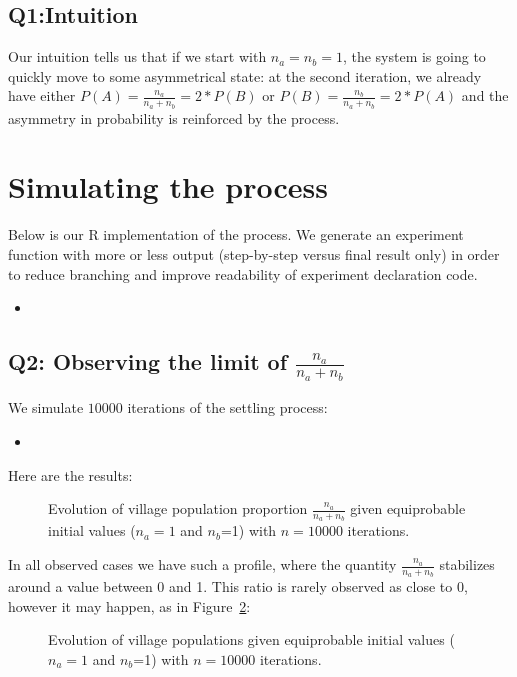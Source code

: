\documentclass{beamer}
\newcommand{\Rscript}[2]{
    \begin{itemize}
        \item[]
    \end{itemize}
}
\begin{document}
\subsection*{Q1:Intuition}
\label{sub:q1_intuition}

Our intuition tells us that if we start with $n_a=n_b=1$, the system is going to quickly move to some asymmetrical state: at the second iteration, we already have either $P(A)=\frac{n_a}{n_a+n_b}=2*P(B)$ or $P(B)=\frac{n_b}{n_a+n_b}=2*P(A)$ and the asymmetry in probability is reinforced by the process.


\section{Simulating the process}
\label{sec:simulating_the_process}

Below is our R implementation of the process. We generate an experiment function with more or less output (step-by-step versus final result only) in order to reduce branching and improve readability of experiment declaration code.
\Rscript{src/village1.R}{Implementation of the village choosing process.}

\subsection*{Q2: Observing the limit of $\frac{n_a}{n_a+n_b}$}
\label{sub:q1_observing_the_limit}
We simulate $10000$ iterations of the settling process:
\Rscript{src/exp1.R}{$10000$ iterations with $n_a$ and $n_b$ initially at $1$ and step-by-step output}
Here are the results:
\begin{figure}[H]
    \centering
    \caption{Evolution of village population proportion $\frac{n_a}{n_a+n_b}$ given equiprobable initial values ($n_a=1$ and $n_b$=1) with $n=10000$ iterations.}
    \label{fig:exp1}
\end{figure}
In all observed cases we have such a profile, where the quantity $\frac{n_a}{n_a+n_b}$ stabilizes around a value between 0 and 1. This ratio is rarely observed as close to 0, however it may happen, as in Figure~\ref{fig:exp3}:
\begin{figure}[H]
    \centering
    \caption{Evolution of village populations given equiprobable initial values ($n_a=1$ and $n_b$=1) with $n=10000$ iterations.}
    \label{fig:exp3}
\end{figure}
\end{document}
